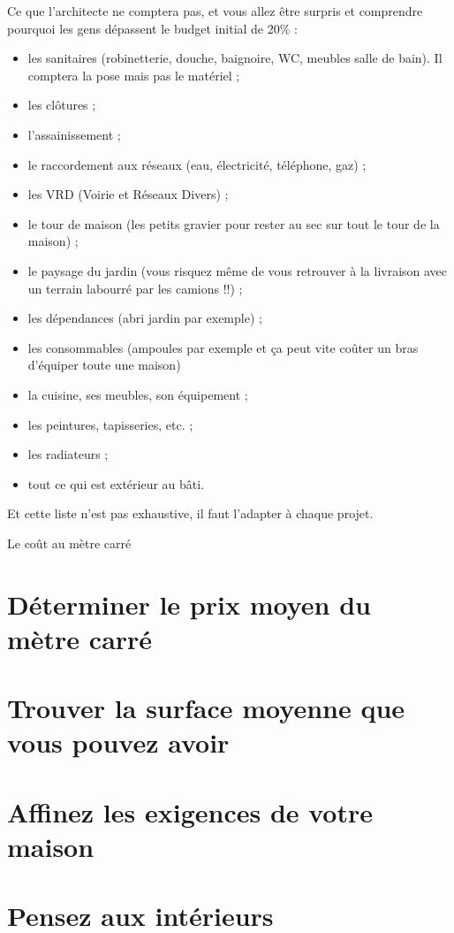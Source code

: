 \documentclass[french]{book}
\begin{document}
Ce que l'architecte ne comptera pas, et vous allez être surpris et comprendre pourquoi les gens dépassent le budget initial de 20\% :
\begin{itemize}
    \item les sanitaires (robinetterie, douche, baignoire, WC, meubles salle de bain). Il comptera la pose mais pas le matériel ;
    \item les clôtures ;
    \item l'assainissement ;
    \item le raccordement aux réseaux (eau, électricité, téléphone, gaz) ;
    \item les VRD (Voirie et Réseaux Divers) ;
    \item le tour de maison (les petits gravier pour rester au sec sur tout le tour de la maison) ;
    \item le paysage du jardin (vous risquez même de vous retrouver à la livraison avec un terrain labourré par les camions !!) ;
    \item les dépendances (abri jardin par exemple) ;
    \item les consommables (ampoules par exemple et ça peut vite coûter un bras d'équiper toute une maison)
    \item la cuisine, ses meubles, son équipement ;
    \item les peintures, tapisseries, etc. ;
    \item les radiateurs ;
    \item tout ce qui est extérieur au bâti.
\end{itemize}

Et cette liste n'est pas exhaustive, il faut l'adapter à chaque projet.

Le coût au mètre carré



\section{Déterminer le prix moyen du mètre carré}
\section{Trouver la surface moyenne que vous pouvez avoir}
\section{Affinez les exigences de votre maison}
\section{Pensez aux intérieurs}
\end{document}
